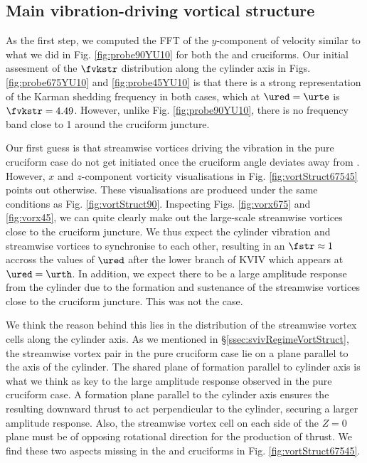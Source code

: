 \documentclass[a4paper,fleqn]{cas-sc}
\begin{document}
\subsection{Main vibration-driving vortical structure}\label{ssec:transitionalRegimeVortStruct}
As the first step, we computed the FFT of the $y$-component of velocity similar to what we did in Fig. \ref{fig:probe90YU10} for both the \angfo{} and \angth{} cruciforms. Our initial assesment of the $\fvkstr$ distribution along the cylinder axis in Figs. \ref{fig:probe675YU10} and \ref{fig:probe45YU10} is that there is a strong representation of the Karman shedding frequency in both cases, which at $\ured = \urte$ is $\fvkstr = 4.49$. However, unlike Fig. \ref{fig:probe90YU10}, there is no frequency band close to 1 around the cruciform juncture.

Our first guess is that streamwise vortices driving the vibration in the pure cruciform case do not get initiated once the cruciform angle deviates away from \angfi{}. However, $x$ and $z$-component vorticity visualisations in Fig. \ref{fig:vortStruct67545} points out otherwise. These visualisations are produced under the same conditions as Fig. \ref{fig:vortStruct90}. Inspecting Figs. \ref{fig:vorx675} and \ref{fig:vorx45}, we can quite clearly make out the large-scale streamwise vortices close to the cruciform juncture. We thus expect the cylinder vibration and streamwise vortices to synchronise to each other, resulting in an $\fstr \approx 1$ accross the values of $\ured$ after the lower branch of KVIV which appears at $\ured = \urth$. In addition, we expect there to be a large amplitude response from the cylinder due to the formation and sustenance of the streamwise vortices close to the cruciform juncture. This was not the case.

We think the reason behind this lies in the distribution of the streamwise vortex cells along the cylinder axis. As we mentioned in \S\ref{ssec:svivRegimeVortStruct}, the streamwise vortex pair in the pure cruciform case lie on a plane parallel to the axis of the cylinder. The shared plane of formation parallel to cylinder axis is what we think as key to the large amplitude response observed in the pure cruciform case. A formation plane parallel to the cylinder axis ensures the resulting downward thrust to act perpendicular to the cylinder, securing a larger amplitude response. Also, the streamwise vortex cell on each side of the $Z = 0$ plane must be of opposing rotational direction for the production of thrust. We find these two aspects missing in the \angfo{} and \angth{} cruciforms in Fig. \ref{fig:vortStruct67545}.
\end{document}
